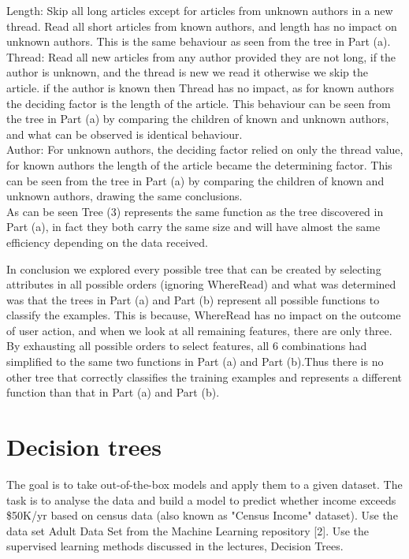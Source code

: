 \documentclass{article}
\begin{document}
\begin{enumerate}[(a)]
Length: Skip all long articles except for articles from unknown authors in a new thread. Read all short articles from known authors, and length has no impact on unknown authors. This is the same behaviour as seen from the tree in Part (a).\\

Thread: Read all new articles from any author provided they are not long, if the author is unknown, and the thread is new we read it otherwise we skip the article. if the author is known then Thread has no impact, as for known authors the deciding factor is the length of the article. This behaviour can be seen from the tree in Part (a) by comparing the children of known and unknown authors, and what can be observed is identical behaviour.\\

Author: For unknown authors, the deciding factor relied on only the thread value, for known authors the length of the article became the determining factor. This can be seen from the tree in Part (a) by comparing the children of known and unknown authors, drawing the same conclusions.\\

As can be seen Tree (3) represents the same function as the tree discovered in Part (a), in fact they both carry the same size and will have almost the same efficiency depending on the data received.

In conclusion we explored every possible tree that can be created by selecting attributes in all possible orders (ignoring WhereRead) and what was determined was that the trees in Part (a) and Part (b) represent all possible functions to classify the examples. This is because, WhereRead has no impact on the outcome of user action, and when we look at all remaining features, there are only three. By exhausting all possible orders to select features, all 6 combinations had simplified to the same two functions in Part (a) and Part (b).Thus there is no other tree that correctly classifies the training examples and represents a different function than that in Part (a) and Part (b).
\end{enumerate}

\newpage
\section{Decision trees}
The goal is to take out-of-the-box models and apply them to a given dataset. The task is to analyse the data and build a model to predict whether income exceeds \$50K/yr based on census data (also known as "Census Income" dataset). Use the data set Adult Data Set from the Machine Learning repository [2]. Use the supervised learning methods discussed in the lectures, Decision Trees.\newline
\end{document}
